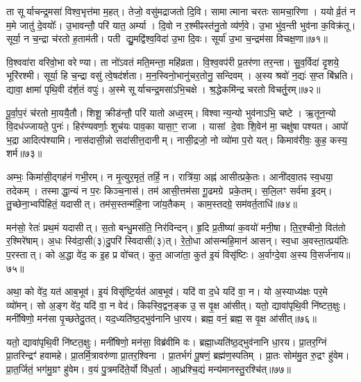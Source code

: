 ता सूर्याचन्द्र॒मसा॑ विश्व॒भृत्त॑मा म॒हत्।
तेजो॒ वसु॑मद्राजतो दि॒वि।
सामात्माना चरतः सामचा॒रिणा।
ययोर्व्र॒तं न म॒मे जातु॑ दे॒वयोः᳚।
उ॒भावन्तौ॒ परि॑ यात॒ अर्म्या।
दि॒वो न र॒श्मीꣴस्त॑नु॒तो व्य॑र्ण॒वे।
उ॒भा भु॑व॒न्ती भुव॑ना क॒विक्र॑तू।
सूर्या॒ न च॒न्द्रा च॑रतो ह॒ताम॑ती।
पती द्यु॒मद्वि॑श्व॒विदा॑ उ॒भा दि॒वः।
सूर्या॑ उ॒भा च॒न्द्रम॑सा विचक्ष॒णा॥७१॥

वि॒श्ववा॑रा वरिवो॒भा वरेण्या।
ता नो॑ऽवतं मति॒मन्ता॒ महि॑व्रता।
वि॒श्व॒वप॑री प्र॒तर॑णा तर॒न्ता।
सु॒व॒र्विदा॑ दृ॒शये॒ भूरि॑रश्मी।
सूर्या॒ हि च॒न्द्रा वसु॑ त्वे॒षद॑र्\mbox{}शता।
म॒न॒स्विनो॒भानु॑चर॒तोनु॒ सन्दिवम्।
अ॒स्य श्रवो॑ न॒द्यः॑ स॒प्त बि॑भ्रति।
द्यावा॒ क्षामा॑ पृथि॒वी द॑र्\mbox{}श॒तं वपुः॑।
अ॒स्मे सूर्याचन्द्र॒मसा॑\-ऽभि॒चक्षे।
श्र॒द्धेकमि॑न्द्र चरतो विचर्तु॒रम्॥७२॥

पू॒र्वा॒प॒रं च॑रतो मा॒ययै॒तौ।
शिशू॒ क्रीड॑न्तौ॒ परि॑ यातो अध्व॒रम्।
विश्वान्य॒न्यो भुव॑नाऽभि॒ चष्टे।
ऋ॒तून॒न्यो वि॒दध॑ज्जायते॒ पुनः॑।
हिर॑ण्यवर्णाः॒ शुच॑यः पाव॒का यासा॒ꣳ॒ राजा।
यासां दे॒वाः शि॒वेन॑ मा॒ चक्षु॑षा पश्यत।
आपो॑ भ॒द्रा आदित्प॑श्यामि।
नास॑दासी॒न्नो सदा॑सीत्त॒दानीम्।
नासी॒द्रजो॒ नो व्यो॑मा प॒रो यत्।
किमाव॑रीवः॒ कुह॒ कस्य॒ शर्म\sn{}॥७३॥

अम्भः॒ किमा॑सी॒द्गह॑नं गभी॒रम्।
न मृ॒त्युर॒मृतं॒ तर्\mbox{}हि॒ न।
रात्रि॑या॒ अह्न॑ आसीत्प्रके॒तः।
आनी॑दवा॒तꣴ स्व॒धया॒ तदेकम्।
तस्माद्धा॒न्यं न प॒रः किञ्च॒नास॑।
तम॑ आसी॒त्तम॑सा गू॒ढमग्रे प्रके॒तम्।
स॒लि॒लꣳ सर्व॑मा इ॒दम्।
तु॒च्छेना॒भ्वपि॑हितं॒ यदासीत्।
तम॑स॒स्तन्म॑हि॒ना जा॑य॒तैकम्।
काम॒स्तदग्रे॒ सम॑वर्त॒ताधि॑॥७४॥

मन॑सो॒ रेतः॑ प्रथ॒मं यदासीत्।
स॒तो बन्धु॒मस॑ति॒ निर॑विन्दन्।
हृ॒दि प्र॒तीष्या॑ क॒वयो॑ मनी॒षा।
ति॒र॒श्चीनो॒ वित॑तो र॒श्मिरे॑षाम्।
अ॒धः स्वि॑दा॒सी(३)दु॒परि॑ स्विदासी(३)त्।
रे॒तो॒धा आ॑सन्महि॒मान॑ आसन्।
स्व॒धा अ॒वस्ता॒त्प्रय॑तिः प॒रस्तात्।
को अ॒द्धा वे॑द॒ क इ॒ह प्र वो॑चत्।
कुत॒ आजा॑ता॒ कुत॑ इ॒यं विसृ॑ष्टिः।
अ॒र्वाग्दे॒वा अ॒स्य वि॒सर्ज॑नाय॥७५॥

अथा॒ को वे॑द॒ यत॑ आब॒भूव॑।
इ॒यं विसृ॑ष्टि॒र्यत॑ आब॒भूव॑।
यदि॑ वा द॒धे यदि॑ वा॒ न।
यो अ॒स्याध्य॑क्षः पर॒मे व्यो॑मन्।
सो अ॒ङ्ग वे॑द॒ यदि॑ वा॒ न वेद॑।
किꣴस्वि॒द्वन॒ङ्क उ॒ स वृ॒क्ष आ॑सीत्।
यतो॒ द्यावा॑पृथि॒वी नि॑ष्टत॒क्षुः।
मनी॑षिणो॒ मन॑सा पृ॒च्छतेदु॒तत्।
यद॒ध्यति॑ष्ठ॒द्भुव॑नानि धा॒रय\sn{}।
ब्रह्म॒ वनं॒ ब्रह्म॒ स वृ॒क्ष आ॑सीत्॥७६॥

यतो॒ द्यावा॑पृथि॒वी नि॑ष्टत॒क्षुः।
मनी॑षिणो॒ मन॑सा॒ विब्र॑वीमि वः।
ब्रह्मा॒ध्यति॑ष्ठ॒द्भुव॑नानि धा॒रय\sn{}।
प्रा॒तर॒ग्निं प्रा॒तरिन्द्रꣳ॑ हवामहे।
प्रा॒तर्मि॒त्रावरु॑णा प्रा॒तर॒श्विना।
प्रा॒तर्भगं॑ पू॒षणं॒ ब्रह्म॑ण॒स्पतिम्।
प्रा॒तः सोम॑मु॒त रु॒द्रꣳ हु॑वेम।
प्रा॒त॒र्जितं॒ भग॑मु॒ग्रꣳ हु॑वेम।
व॒यं पु॒त्रमदि॑ते॒र्यो वि॑ध॒र्ता।
आ॒ध्रश्चि॒द्यं मन्य॑मानस्तु॒रश्चि॑त्॥७७॥

